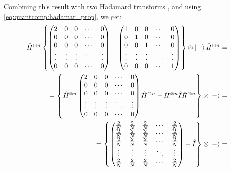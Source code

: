 Combining this result with two Hadamard transforms , and using \eqref{eq:quantcomp:hadamar_prop}, we get:
\begin{eqnarray}
\hat{H}^{\otimes n}
\left\{
\begin{pmatrix}
2  & 0 & 0 & \cdots & 0 \\
0 & 0 & 0 & \cdots & 0 \\
0 & 0 & 0 & \cdots & 0 \\
\vdots & \vdots & \vdots & \ddots & \vdots \\
0 & 0 & 0  & \cdots & 0 \\
\end{pmatrix} - 
\begin{pmatrix}
1 & 0 & 0 & \cdots & 0 \\
0 & 1 & 0 & \cdots & 0 \\
0 & 0 & 1 & \cdots & 0 \\
\vdots & \vdots & \vdots & \ddots & \vdots \\
0 & 0 & 0  & \cdots & 1  \\
\end{pmatrix}
\right\}
\otimes \ket{-}
\hat{H}^{\otimes n}
=
\nonumber \\
=
\left\{
\hat{H}^{\otimes n}
\begin{pmatrix}
2  & 0 & 0 & \cdots & 0 \\
0 & 0 & 0 & \cdots & 0 \\
0 & 0 & 0 & \cdots & 0 \\
\vdots & \vdots & \vdots & \ddots & \vdots \\
0 & 0 & 0  & \cdots & 0 \\
\end{pmatrix}
\hat{H}^{\otimes n}
- \hat{H}^{\otimes n} \hat{I} \hat{H}^{\otimes n}
\right\}
\otimes \ket{-}
 = 
\nonumber \\
=
\left\{
\begin{pmatrix}
\frac{2}{N}  & \frac{2}{N} & \frac{2}{N} & \cdots & \frac{2}{N} \\
\frac{2}{N} & \frac{2}{N} & \frac{2}{N} & \cdots & \frac{2}{N} \\
\frac{2}{N} & \frac{2}{N} & \frac{2}{N} & \cdots & \frac{2}{N} \\
\vdots & \vdots & \vdots & \ddots & \vdots \\
\frac{2}{N} & \frac{2}{N} & \frac{2}{N} & \cdots & \frac{2}{N} \\
\end{pmatrix} - \hat{I}
\right\}
\otimes \ket{-}
=
\nonumber \\

\end{eqnarray}
